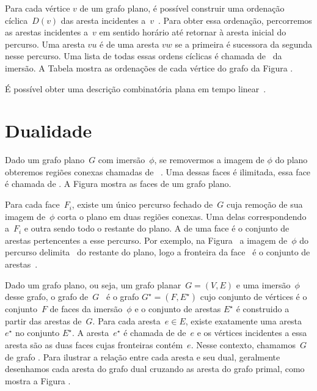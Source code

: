 Para cada vértice $v$ de um grafo plano, é possível construir uma ordenação cíclica~$D(v)$ das aresta incidentes a~$v$~\cite{noma2003}.
Para obter essa ordenação, percorremos as arestas incidentes a~$v$ em sentido horário até retornar à aresta inicial do percurso.
Uma aresta $vu$ é  de uma aresta $vw$ se a primeira é sucessora da segunda nesse percurso.
Uma lista de todas essas ordens cíclicas é chamada de~ da imersão.
A Tabela  mostra as ordenações de cada vértice do grafo da Figura .

É possível obter uma descrição combinatória plana em tempo linear~.

\section{Dualidade}

Dado um grafo plano~$G$ com imersão~$\phi$, se removermos a imagem de $\phi$ do plano obteremos regiões conexas chamadas de ~\cite{planarTheoryAlgorith}.
Uma dessas faces é ilimitada, essa face é chamada de .
A Figura  mostra as faces de um grafo plano.


Para cada face~$F_i$, existe um único percurso fechado de~$G$ cuja remoção de sua imagem de~$\phi$ corta o plano em duas regiões conexas.
Uma delas correspondendo a~$F_i$ e outra sendo todo o restante do plano.
A  de uma face é o conjunto de arestas pertencentes a esse percurso.
Por exemplo, na Figura~ a imagem de~$\phi$ do percurso  delimita~ do restante do plano, logo a fronteira da face~ é o conjunto de arestas~.

Dado um grafo plano, ou seja, um grafo planar~$G=(V,E)$ e uma imersão~$\phi$ desse grafo, o grafo  de~$G$~\cite{planarTheoryAlgorith} é o grafo $G^\star = (F,E^\star)$ cujo conjunto de vértices é o conjunto~$F$ de faces da imersão~$\phi$ e o conjunto de arestas $E^\star$ é construido a partir das arestas de~$G$.
Para cada aresta~$e\in E$, existe exatamente uma aresta~$e^\star$ no conjunto $E^\star$.
A aresta~$e^\star$ é chamada de  de~$e$ e os vértices incidentes a essa aresta são as duas faces cujas fronteiras contém~$e$.
Nesse contexto, chamamos~$G$ de grafo .
Para ilustrar a relação entre cada aresta e seu dual, geralmente desenhamos cada aresta do grafo dual cruzando as aresta do grafo primal, como mostra a Figura .

